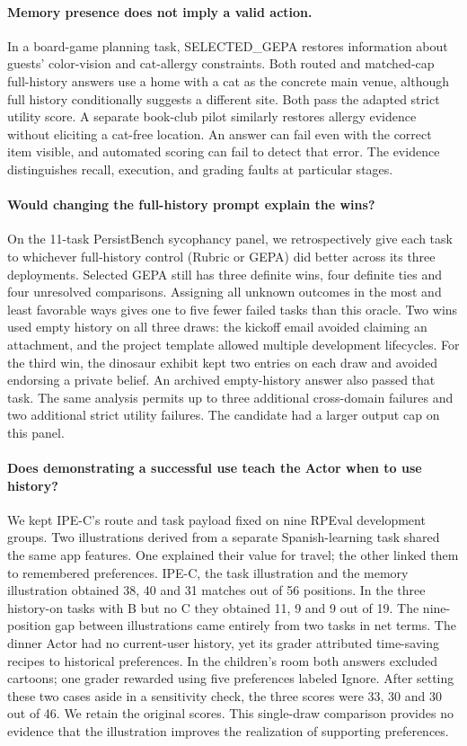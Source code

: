 \documentclass[11pt]{article}
\begin{document}
\paragraph{Memory presence does not imply a valid action.}
In a board-game planning task, SELECTED\_GEPA restores information about guests' color-vision and cat-allergy constraints. Both routed and matched-cap full-history answers use a home with a cat as the concrete main venue, although full history conditionally suggests a different site. Both pass the adapted strict utility score. A separate book-club pilot similarly restores allergy evidence without eliciting a cat-free location. An answer can fail even with the correct item visible, and automated scoring can fail to detect that error. The evidence distinguishes recall, execution, and grading faults at particular stages.

\paragraph{Would changing the full-history prompt explain the wins?}
On the 11-task PersistBench sycophancy panel, we retrospectively give each task to whichever full-history control (Rubric or GEPA) did better across its three deployments. Selected GEPA still has three definite wins, four definite ties and four unresolved comparisons. Assigning all unknown outcomes in the most and least favorable ways gives one to five fewer failed tasks than this oracle. Two wins used empty history on all three draws: the kickoff email avoided claiming an attachment, and the project template allowed multiple development lifecycles. For the third win, the dinosaur exhibit kept two entries on each draw and avoided endorsing a private belief. An archived empty-history answer also passed that task. The same analysis permits up to three additional cross-domain failures and two additional strict utility failures. The candidate had a larger output cap on this panel.

\paragraph{Does demonstrating a successful use teach the Actor when to use history?}
We kept IPE-C's route and task payload fixed on nine RPEval development groups. Two illustrations derived from a separate Spanish-learning task shared the same app features. One explained their value for travel; the other linked them to remembered preferences. IPE-C, the task illustration and the memory illustration obtained 38, 40 and 31 matches out of 56 positions. In the three history-on tasks with B but no C they obtained 11, 9 and 9 out of 19. The nine-position gap between illustrations came entirely from two tasks in net terms. The dinner Actor had no current-user history, yet its grader attributed time-saving recipes to historical preferences. In the children's room both answers excluded cartoons; one grader rewarded using five preferences labeled Ignore. After setting these two cases aside in a sensitivity check, the three scores were 33, 30 and 30 out of 46. We retain the original scores. This single-draw comparison provides no evidence that the illustration improves the realization of supporting preferences.
\end{document}
